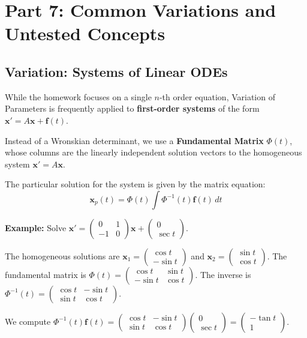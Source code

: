 \documentclass[12pt]{article}
\begin{document}
\newpage
\section{Part 7: Common Variations and Untested Concepts}

\subsection{Variation: Systems of Linear ODEs}
While the homework focuses on a single $n$-th order equation, Variation of Parameters is frequently applied to \textbf{first-order systems} of the form $\mathbf{x}' = A\mathbf{x} + \mathbf{f}(t)$. 

Instead of a Wronskian determinant, we use a \textbf{Fundamental Matrix} $\Phi(t)$, whose columns are the linearly independent solution vectors to the homogeneous system $\mathbf{x}' = A\mathbf{x}$.

The particular solution for the system is given by the matrix equation:
\[ \mathbf{x}_p(t) = \Phi(t) \int \Phi^{-1}(t) \mathbf{f}(t) \, dt \]

\textbf{Example:}
Solve $\mathbf{x}' = \begin{pmatrix} 0 & 1 \\ -1 & 0 \end{pmatrix} \mathbf{x} + \begin{pmatrix} 0 \\ \sec t \end{pmatrix}$.

The homogeneous solutions are $\mathbf{x}_1 = \begin{pmatrix} \cos t \\ -\sin t \end{pmatrix}$ and $\mathbf{x}_2 = \begin{pmatrix} \sin t \\ \cos t \end{pmatrix}$.
The fundamental matrix is $\Phi(t) = \begin{pmatrix} \cos t & \sin t \\ -\sin t & \cos t \end{pmatrix}$.
The inverse is $\Phi^{-1}(t) = \begin{pmatrix} \cos t & -\sin t \\ \sin t & \cos t \end{pmatrix}$.

We compute $\Phi^{-1}(t) \mathbf{f}(t) = \begin{pmatrix} \cos t & -\sin t \\ \sin t & \cos t \end{pmatrix} \begin{pmatrix} 0 \\ \sec t \end{pmatrix} = \begin{pmatrix} -\tan t \\ 1 \end{pmatrix}$.
\end{document}
